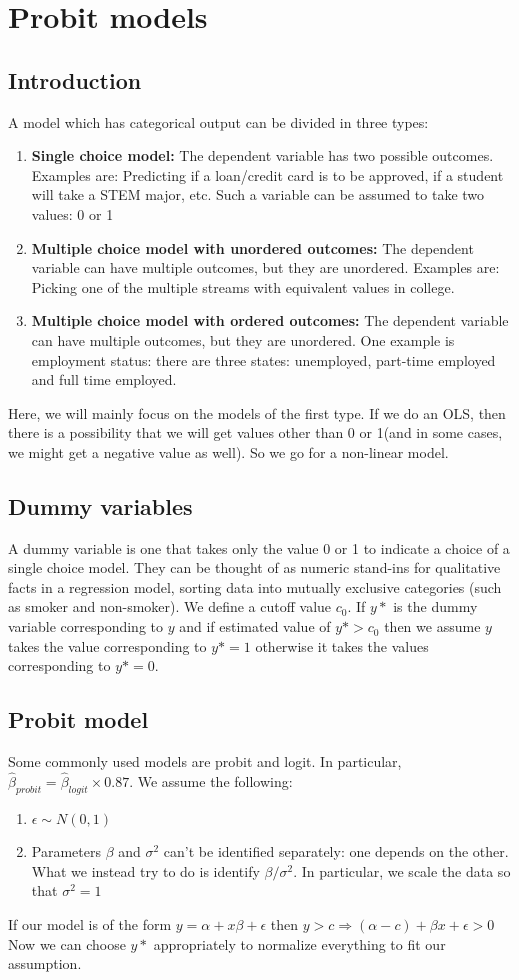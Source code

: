 \documentclass[notoc]{tufte-book}
\begin{document}
\chapter{Probit models}
\section{Introduction}
A model which has categorical output can be divided in three types:\
\begin{enumerate}
    \item \textbf{Single choice model: }The dependent variable has two possible outcomes. Examples are: Predicting if a loan/credit card is to be approved, if a student will take a STEM major, etc. Such a variable can be assumed to take two values: 0 or 1
    \item \textbf{Multiple choice model with unordered outcomes: }The dependent variable can have multiple outcomes, but they are unordered. Examples are: Picking one of the multiple streams with equivalent values in college.
    \item \textbf{Multiple choice model with ordered outcomes: }The dependent variable can have multiple outcomes, but they are unordered. One example is  employment status: there are three states: unemployed, part-time employed and full time employed.
\end{enumerate}
Here, we will mainly focus on the models of the first type. If we do an OLS, then there is a possibility that we will get values other than 0 or 1(and in some cases, we might get a negative value as well). So we go for a non-linear model. 
\section{Dummy variables}
A dummy variable is one that takes only the value 0 or 1 to indicate a choice of a single choice model. They can be thought of as numeric stand-ins for qualitative facts in a regression model, sorting data into mutually exclusive categories (such as smoker and non-smoker). We define a cutoff value $c_0$. If $y*$ is the dummy variable corresponding to $y$ and if estimated value of $y*>c_0$ then we assume $y$ takes the value corresponding to $y*=1$ otherwise it takes the values corresponding to $y*=0$. 
\section{Probit model}
Some commonly used models are probit and logit. In particular, $\hat\beta_{probit}=\hat\beta_{logit}\times0.87$. We assume the following:
\begin{enumerate}
    \item $\epsilon\sim N(0,1)$
    \item Parameters $\beta$ and $\sigma^2$ can't be identified separately: one depends on the other. What we instead try to do is identify $\beta/\sigma^2$. In particular, we scale the data so that $\sigma^2=1$
\end{enumerate}
If our model is of the form $y=\alpha+x\beta+\epsilon$ then $y>c\Rightarrow (\alpha-c)+\beta x+\epsilon>0$ Now we can choose $y*$ appropriately to normalize everything to fit our assumption.
\end{document}

